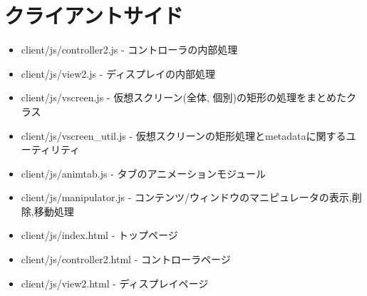 \documentclass[a4paper,10pt,oneside]{jsbook}
\begin{document}
\section{クライアントサイド}
\begin{itemize}
\item client/js/controller2.js - コントローラの内部処理
\item client/js/view2.js - ディスプレイの内部処理
\item client/js/vscreen.js - 仮想スクリーン(全体, 個別)の矩形の処理をまとめたクラス
\item client/js/vscreen\_util.js - 仮想スクリーンの矩形処理とmetadataに関するユーティリティ
\item client/js/animtab.js - タブのアニメーションモジュール
\item client/js/manipulator.js - コンテンツ/ウィンドウのマニピュレータの表示,削除,移動処理
\item client/js/index.html - トップページ
\item client/js/controller2.html - コントローラページ
\item client/js/view2.html - ディスプレイページ
\end{itemize}
\end{document}

